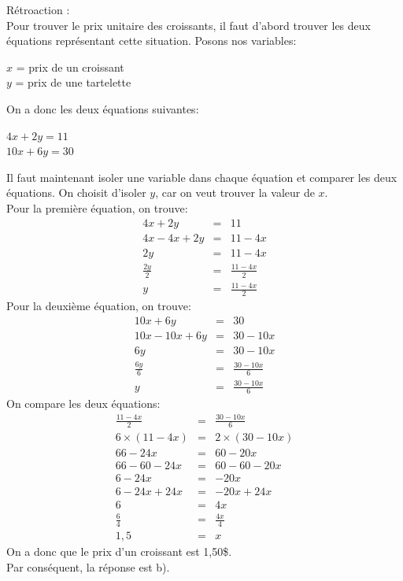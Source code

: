 \documentclass[letterpaper, 12pt]{article}
\begin{document}
R\'etroaction :\\
Pour trouver le prix unitaire des croissants, il  faut d'abord trouver les deux \'equations repr\'esentant cette situation. Posons nos variables:
\begin{center}
 $x$ = prix de un croissant\\
$y$ = prix de une tartelette\\
\end{center}
On a donc les deux \'equations suivantes:
\begin{center}
$4x+2y=11$ \\
$10x+6y=30$\\
\end{center}
Il faut maintenant isoler une variable dans chaque \'equation et comparer les deux \'equations. On choisit d'isoler $y$, car on veut trouver la valeur de $x$.\\
Pour la premi\`ere \'equation, on trouve:
\begin{eqnarray*}
 4x+2y&=&11\\
4x-4x+2y&=&11-4x\\
2y&=&11-4x\\[2mm]
\frac{2y}{2}&=&\frac{11-4x}{2}\\[2mm]
y&=&\frac{11-4x}{2}
\end{eqnarray*}
Pour la deuxi\`eme \'equation, on trouve:
\begin{eqnarray*}
 10x+6y&=&30\\
10x-10x+6y&=&30-10x\\
6y&=&30-10x\\[2mm]
\frac{6y}{6}&=&\frac{30-10x}{6}\\[2mm]
y&=&\frac{30-10x}{6}
\end{eqnarray*}
On compare les deux \'equations:
\begin{eqnarray*}
\frac{11-4x}{2}&=&\frac{30-10x}{6}\\[2mm]
6\times (11-4x) &=& 2 \times (30-10x)\\
66-24x &=& 60-20x\\
66-60-24x &=& 60-60-20x\\
6-24x &=& -20x\\
6-24x+24x &=& -20x+24x\\
6 &=& 4x\\[2mm]
\frac{6}{4}&=&\frac{4x}{4}\\[2mm]
1,5 &=& x
\end{eqnarray*}
On a donc que le prix d'un croissant est 1,50\$. \\
Par cons\'equent, la r\'eponse est b).\\
\end{document}
